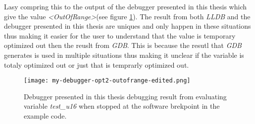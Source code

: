 Lasy compring this to the output of the debugger presented in this thesis which give the value \emph{<OutOfRange>}(see figure \ref{fig:mydebuggeroutofrange}).
The result from both \emph{LLDB} and the debugger presented in this thesis are uniques and only happen in these situations thus making it easier for the user to understand that the value is temporary optimized out then the reuslt from \emph{GDB}.
This is because the resutl that \emph{GDB} generates is used in multiple situations thus making it unclear if the variable is totaly optimized out or just that is temprarly optimized out.


\begin{figure}[h]
    \centering
    \texttt{[image: my-debugger-opt2-outofrange-edited.png]}
	\caption{Debugger presented in this thesis debugging result from evaluating variable \emph{test\_u16} when stopped at the software brekpoint in the example code.}
    \label{fig:mydebuggeroutofrange}
\end{figure}


